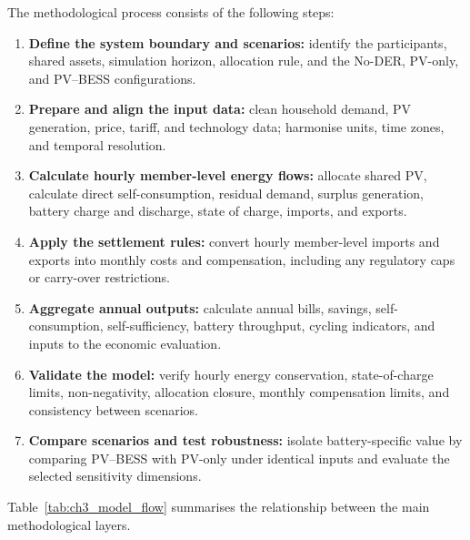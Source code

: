 The methodological process consists of the following steps:

\begin{enumerate}
    \item \textbf{Define the system boundary and scenarios:} identify the participants, shared assets, simulation horizon, allocation rule, and the No-DER, PV-only, and PV--BESS configurations.
    \item \textbf{Prepare and align the input data:} clean household demand, PV generation, price, tariff, and technology data; harmonise units, time zones, and temporal resolution.
    \item \textbf{Calculate hourly member-level energy flows:} allocate shared PV, calculate direct self-consumption, residual demand, surplus generation, battery charge and discharge, state of charge, imports, and exports.
    \item \textbf{Apply the settlement rules:} convert hourly member-level imports and exports into monthly costs and compensation, including any regulatory caps or carry-over restrictions.
    \item \textbf{Aggregate annual outputs:} calculate annual bills, savings, self-consumption, self-sufficiency, battery throughput, cycling indicators, and inputs to the economic evaluation.
    \item \textbf{Validate the model:} verify hourly energy conservation, state-of-charge limits, non-negativity, allocation closure, monthly compensation limits, and consistency between scenarios.
    \item \textbf{Compare scenarios and test robustness:} isolate battery-specific value by comparing PV--BESS with PV-only under identical inputs and evaluate the selected sensitivity dimensions.
\end{enumerate}

Table~\ref{tab:ch3_model_flow} summarises the relationship between the main methodological layers.


